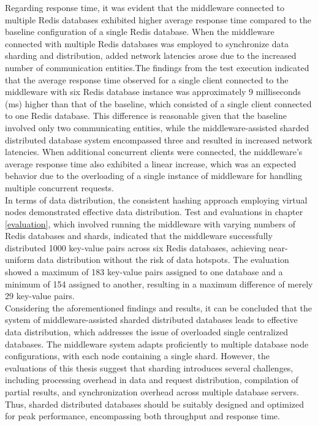 \noindent Regarding response time, it was evident that the middleware connected to multiple Redis databases exhibited higher average response time compared to the baseline configuration of a single Redis database. When the middleware connected with multiple Redis databases was employed to synchronize data sharding and distribution, added network latencies arose due to the increased number of communication entities.The findings from the test execution indicated that the average response time observed for a single client connected to the middleware with six Redis database instance was approximately 9 milliseconds (ms) higher than that of the baseline, which consisted of a single client connected to one Redis database. This difference is reasonable given that the baseline involved only two communicating entities, while the middleware-assisted sharded distributed database system encompassed three and resulted in increased network latencies. When additional concurrent clients were connected, the middleware's average response time also exhibited a linear increase, which was an expected behavior due to the overloading of a single instance of middleware for handling multiple concurrent requests. \\

\noindent In terms of data distribution, the consistent hashing approach employing virtual nodes demonstrated effective data distribution. Test and evaluations in chapter \ref{evaluation}, which involved running the middleware with varying numbers of Redis databases and shards, indicated that the middleware successfully distributed 1000 key-value pairs across six Redis databases, achieving near-uniform data distribution without the risk of data hotspots. The evaluation showed a maximum of 183 key-value pairs assigned to one database and a minimum of 154 assigned to another, resulting in a maximum difference of merely 29 key-value pairs. \\

\noindent Considering the aforementioned findings and results, it can be concluded that the system of middleware-assisted sharded distributed databases leads to effective data distribution, which addresses the issue of overloaded single centralized databases. The middleware system adapts proficiently to multiple database node configurations, with each node containing a single shard. However, the evaluations of this thesis suggest that sharding introduces several challenges, including processing overhead in data and request distribution, compilation of partial results, and synchronization overhead across multiple database servers. Thus, sharded distributed databases should be suitably designed and optimized for peak performance, encompassing both throughput and response time.




